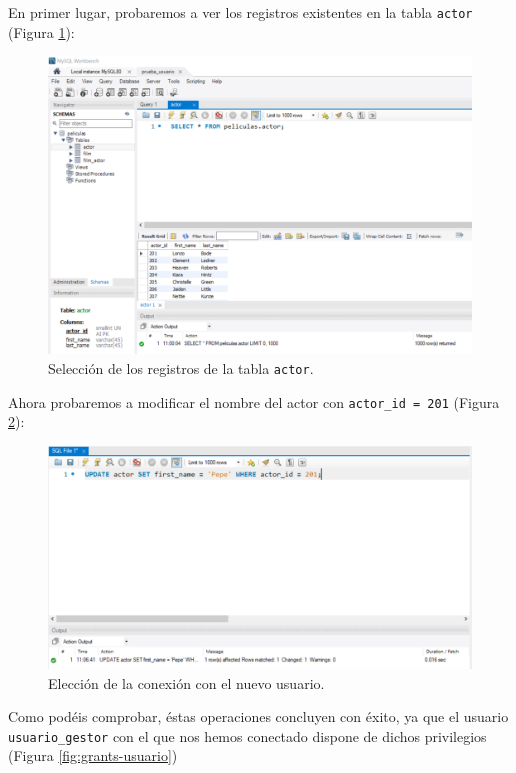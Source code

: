\documentclass{db-practice}
\begin{document}
En primer lugar, probaremos a ver los registros existentes en la tabla \texttt{actor} (Figura \ref{fig:select}):

\begin{figure}[H]
    \centering
    \includegraphics[width=\textwidth]{figs/gestion-usuarios/select_usr.PNG}
    \caption{Selección de los registros de la tabla \texttt{actor}.}
    \label{fig:select}
\end{figure}

Ahora probaremos a modificar el nombre del actor con \texttt{actor\_id = 201} (Figura \ref{fig:update}):

\begin{figure}[H]
    \centering
    \includegraphics[width=\textwidth]{figs/gestion-usuarios/update_usr.PNG}
    \caption{Elección de la conexión con el nuevo usuario.}
    \label{fig:update}
\end{figure}

Como podéis comprobar, éstas operaciones concluyen con éxito, ya que el usuario \texttt{usuario\_gestor} con el que nos hemos conectado dispone de dichos privilegios (Figura \ref{fig:grants-usuario})
\end{document}
